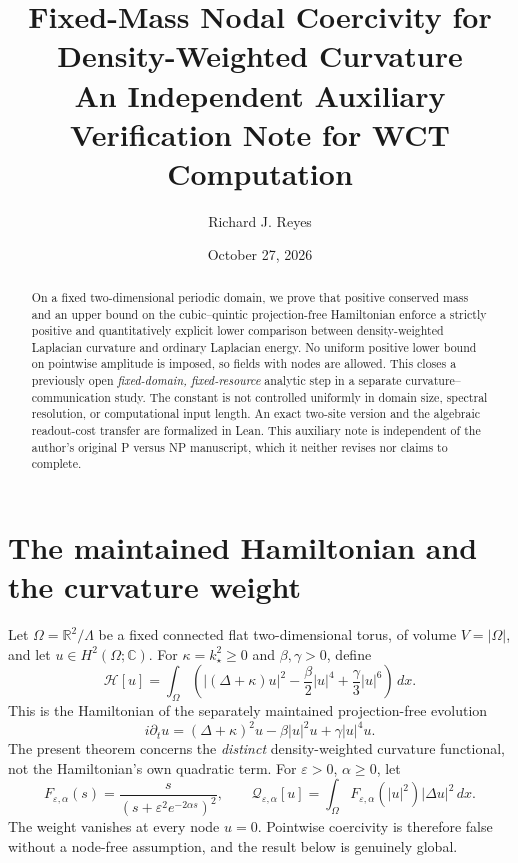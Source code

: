 \documentclass[11pt]{article}
\title{\textbf{Fixed-Mass Nodal Coercivity for Density-Weighted Curvature}\\[4pt]
\large An Independent Auxiliary Verification Note for WCT Computation}
\author{Richard J. Reyes}
\date{October 27, 2026}
\newcommand{\dd}{\,dx}
\begin{document}
\maketitle
\begin{abstract}
On a fixed two-dimensional periodic domain, we prove that positive conserved mass
and an upper bound on the cubic--quintic projection-free Hamiltonian enforce a
strictly positive and quantitatively explicit lower comparison between
density-weighted Laplacian curvature and ordinary Laplacian energy.
No uniform positive lower bound on pointwise amplitude is imposed, so fields
with nodes are allowed. This closes a previously open \emph{fixed-domain,
fixed-resource} analytic step in a separate curvature--communication study.
The constant is not controlled uniformly in domain size, spectral resolution,
or computational input length. An exact two-site version and the algebraic
readout-cost transfer are formalized in Lean. This auxiliary note is independent
of the author's original P versus NP manuscript, which it neither revises nor
claims to complete.
\end{abstract}

\section{The maintained Hamiltonian and the curvature weight}
Let \(\Omega=\mathbb R^2/\Lambda\) be a fixed connected flat two-dimensional
torus, of volume \(V=|\Omega|\), and let \(u\in H^2(\Omega;\mathbb C)\).
For \(\kappa=k_\star^2\geq0\) and \(\beta,\gamma>0\), define
\begin{equation}
\label{eq:H}
\mathcal H[u]=\int_\Omega
\left(|(\Delta+\kappa)u|^2-\frac{\beta}{2}|u|^4
+\frac{\gamma}{3}|u|^6\right)\dd.
\end{equation}
This is the Hamiltonian of the separately maintained projection-free evolution
\begin{equation}
\label{eq:pde}
i\partial_tu=(\Delta+\kappa)^2u-\beta|u|^2u+\gamma|u|^4u.
\end{equation}
The present theorem concerns the \emph{distinct} density-weighted curvature
functional, not the Hamiltonian's own quadratic term. For
\(\varepsilon>0\), \(\alpha\geq0\), let
\begin{equation}
\label{eq:Q}
F_{\varepsilon,\alpha}(s)=
\frac{s}{(s+\varepsilon^2e^{-2\alpha s})^2},\qquad
\mathcal Q_{\varepsilon,\alpha}[u]
=\int_\Omega F_{\varepsilon,\alpha}(|u|^2)|\Delta u|^2\dd.
\end{equation}
The weight vanishes at every node \(u=0\). Pointwise coercivity is therefore
false without a node-free assumption, and the result below is genuinely global.
\end{document}
